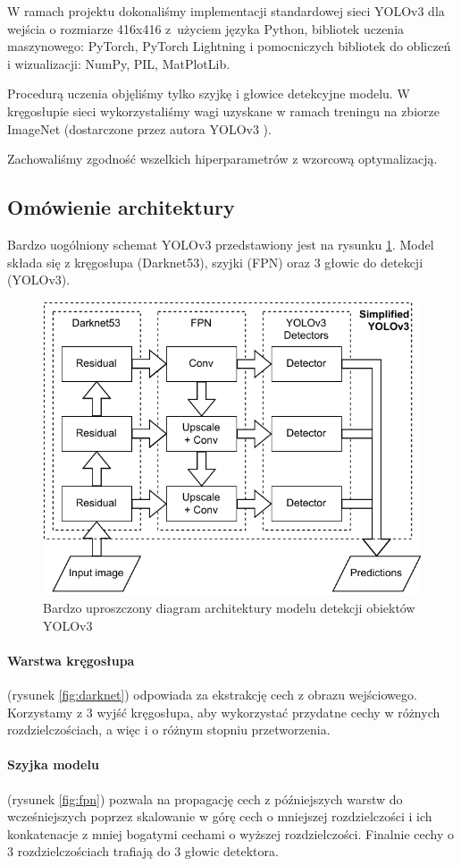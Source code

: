 \documentclass{article}
\begin{document}
W ramach projektu dokonaliśmy implementacji standardowej sieci YOLOv3 dla wejścia o rozmiarze 416x416 z~użyciem języka Python, bibliotek uczenia maszynowego: PyTorch, PyTorch Lightning i pomocniczych bibliotek do obliczeń i wizualizacji: NumPy, PIL, MatPlotLib.

Procedurą uczenia objęliśmy tylko szyjkę i głowice detekcyjne modelu. W kręgosłupie sieci wykorzystaliśmy wagi uzyskane w ramach treningu na zbiorze ImageNet (dostarczone przez autora YOLOv3 \citep{redmon2018yolov3}).

Zachowaliśmy zgodność wszelkich hiperparametrów z wzorcową optymalizacją.

\subsection{Omówienie architektury}

Bardzo uogólniony schemat YOLOv3 przedstawiony jest na rysunku \ref{fig:simple_yolov3}. Model składa się z kręgosłupa (Darknet53), szyjki (FPN) oraz 3 głowic do detekcji (YOLOv3).

\begin{figure}[!h]
    \centering \includegraphics[width=0.6\linewidth]{simple-yolov3}
    \caption{Bardzo uproszczony diagram architektury modelu detekcji obiektów YOLOv3}
    \label{fig:simple_yolov3}
\end{figure}

\paragraph{Warstwa kręgosłupa} (rysunek \ref{fig:darknet}) odpowiada za ekstrakcję cech z obrazu wejściowego. Korzystamy z 3 wyjść kręgosłupa, aby wykorzystać przydatne cechy w różnych rozdzielczościach, a więc i o różnym stopniu przetworzenia.

\paragraph{Szyjka modelu} (rysunek \ref{fig:fpn}) pozwala na propagację cech z późniejszych warstw do wcześniejszych poprzez skalowanie w górę cech o mniejszej rozdzielczości i ich konkatenacje z mniej bogatymi cechami o wyższej rozdzielczości. Finalnie cechy o 3 rozdzielczościach trafiają do 3 głowic detektora.
\end{document}
